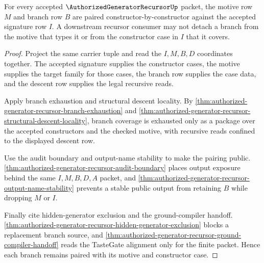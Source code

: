 \begin{theorem}
\label{thm:authorized-generator-recursor-branch-motive-pairing}
For every accepted $\AuthorizedGeneratorRecursorUp$ packet, the motive row $M$
and branch row $B$ are paired constructor-by-constructor against the accepted
signature row $I$. A downstream recursor consumer may not detach a branch from
the motive that types it or from the constructor case in $I$ that it covers.
\end{theorem}
\begin{proof}
Project the same carrier tuple and read the $I,M,B,D$ coordinates together.
The accepted signature supplies the constructor cases, the motive supplies the
target family for those cases, the branch row supplies the case data, and the
descent row supplies the legal recursive reads.

Apply branch exhaustion and structural descent locality. By
\autoref{thm:authorized-generator-recursor-branch-exhaustion} and
\autoref{thm:authorized-generator-recursor-structural-descent-locality}, branch
coverage is exhausted only as a package over the accepted constructors and the
checked motive, with recursive reads confined to the displayed descent row.

Use the audit boundary and output-name stability to make the pairing public.
\autoref{thm:authorized-generator-recursor-audit-boundary} places output
exposure behind the same $I,M,B,D,A$ packet, and
\autoref{thm:authorized-generator-recursor-output-name-stability} prevents a
stable public output from retaining $B$ while dropping $M$ or $I$.

Finally cite hidden-generator exclusion and the ground-compiler handoff.
\autoref{thm:authorized-generator-recursor-hidden-generator-exclusion} blocks a
replacement branch source, and
\autoref{thm:authorized-generator-recursor-ground-compiler-handoff} reads the
TasteGate alignment only for the finite packet. Hence each branch remains paired
with its motive and constructor case.
\end{proof}

